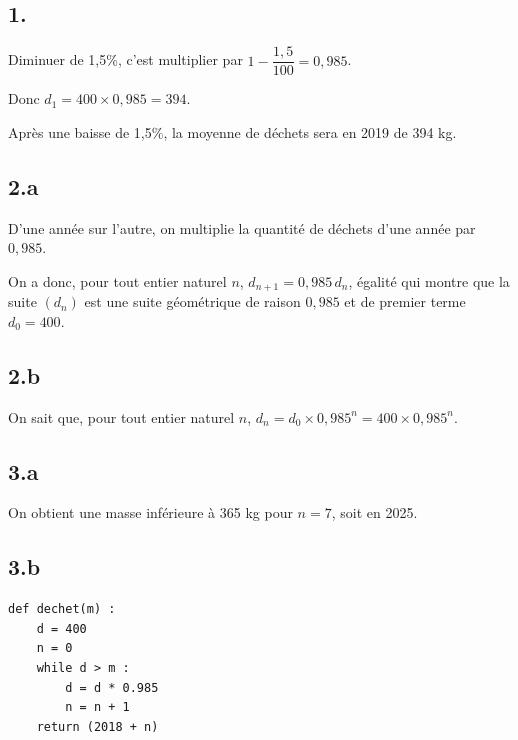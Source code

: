 \subsection*{1.}
	Diminuer de 1,5\%, c'est multiplier par \(1 - \dfrac{1,5}{100} = 0,985\).
	
	Donc \(d_1 = 400 \times 0,985 = 394\).
	
	Après une baisse de 1,5\%, la moyenne de déchets sera en 2019 de 394 kg.
	
	\subsection*{2.a}
	
	D'une année sur l'autre, on multiplie la quantité de déchets d'une année par \( 0,985 \).
	
	On a donc, pour tout entier naturel \( n \), \( d_{n+1} = 0,985 \, d_n \), égalité qui montre que la suite \( (d_n) \) est une suite géométrique de raison \( 0,985 \) et de premier terme \( d_0 = 400 \).
	
	\subsection*{2.b}
	
	On sait que, pour tout entier naturel \( n \), \( d_n = d_0 \times 0,985^n = 400 \times 0,985^n \).
	
	\subsection*{3.a}
	
	On obtient une masse inférieure à 365 kg pour \( n = 7 \), soit en 2025.
	
	\subsection*{3.b}
	\begin{lstlisting}[style=python]
def dechet(m) :
	d = 400
	n = 0
	while d > m :
		d = d * 0.985
		n = n + 1
	return (2018 + n)
	\end{lstlisting}
